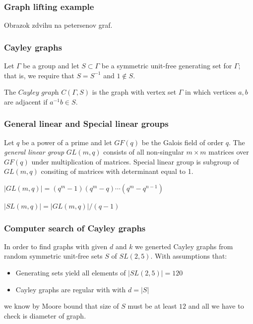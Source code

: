 \documentclass{beamer}
\begin{document}
\begin{frame}
	\frametitle{Graph lifting example}
	Obrazok zdvihu na petersenov graf.
\end{frame}
\begin{frame}
	\frametitle{Cayley graphs}
	Let $\Gamma$ be a group and let $S\subset \Gamma$ be a symmetric unit-free generating set for $\Gamma$; that is, we require that $S=S^{-1}$ and $1\notin S$. 
	\begin{definition}
		The $\textit{Cayley graph}$ $C(\Gamma,S)$ is the graph with vertex set $\Gamma$ in which vertices $a,b$ are adjacent if $a^{-1}b\in S$. 		
	\end{definition}
\end{frame}
\begin{frame}
	\frametitle{General linear and Special linear groups}
		\begin{definition} Let $q$ be a power of a prime and let $GF(q)$ be the Galois field of order $q$. The {\em general linear group} $GL(m,q)$ consists of all non-singular $m\times m$ matrices over $GF(q)$ under multiplication of matrices.
		Special linear group is subgroup of $GL(m,q)$ consiting of matrices with determinant equal to 1.
		\end{definition}
		\begin{theorem}[Order of $GL(m,q)$]
			$|GL(m,q)| = (q^m - 1)(q^m - q) \cdots (q^m - q^{n-1})$
		\end{theorem}
		\begin{theorem}[Order of $SL(m,q)$]
			$|SL(m,q)| = |GL(m,q)|/(q-1)$
		\end{theorem}
\end{frame}
\begin{frame}
	\frametitle{Computer search of Cayley graphs}
	In order to find graphs with given $d$ and $k$ we generted Cayley graphs from random symmetric unit-free sets $S$ of $SL(2,5)$. 
	\medskip
	With assumptions that: 
	\begin{itemize}
		\item Generating sets yield all elements of $|SL(2,5)| = 120$
		\item Cayley graphs are regular with with $d=|S|$
	\end{itemize}
	we know by Moore bound that size of $S$ must be at least $12$ and all we have to check is diameter of graph. 
\end{frame}
\end{document}
